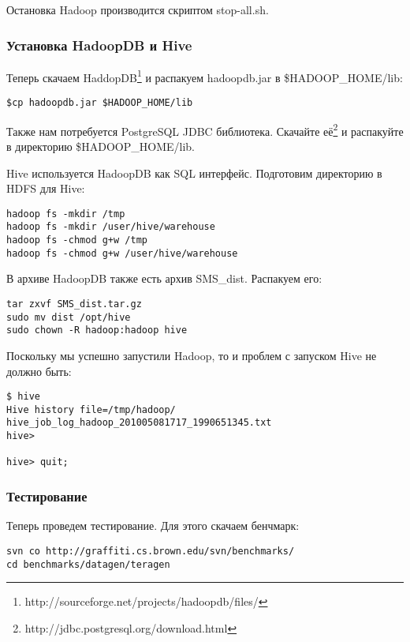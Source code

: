 Остановка Hadoop производится скриптом stop-all.sh.

\subsubsection{Установка HadoopDB и Hive}
Теперь скачаем HaddopDB\footnote{http://sourceforge.net/projects/hadoopdb/files/} и распакуем hadoopdb.jar в \$HADOOP\_HOME/lib:
\begin{lstlisting}[label=lst:haddop15,caption=Установка HadoopDB]
$cp hadoopdb.jar $HADOOP_HOME/lib
\end{lstlisting}

Также нам потребуется PostgreSQL JDBC библиотека. Скачайте её\footnote{http://jdbc.postgresql.org/download.html} и
распакуйте в директорию \$HADOOP\_HOME/lib.

Hive используется HadoopDB как SQL интерфейс. Подготовим директорию в HDFS для Hive:
\begin{lstlisting}[label=lst:haddop16,caption=Установка HadoopDB]
hadoop fs -mkdir /tmp
hadoop fs -mkdir /user/hive/warehouse
hadoop fs -chmod g+w /tmp
hadoop fs -chmod g+w /user/hive/warehouse
\end{lstlisting}

В архиве HadoopDB также есть архив SMS\_dist. Распакуем его:
\begin{lstlisting}[label=lst:haddop17,caption=Установка HadoopDB]
tar zxvf SMS_dist.tar.gz
sudo mv dist /opt/hive
sudo chown -R hadoop:hadoop hive
\end{lstlisting}

Поскольку мы успешно запустили Hadoop, то и проблем с запуском Hive не должно быть:
\begin{lstlisting}[label=lst:haddop18,caption=Установка HadoopDB]
$ hive
Hive history file=/tmp/hadoop/
hive_job_log_hadoop_201005081717_1990651345.txt
hive>

hive> quit;
\end{lstlisting}

\subsubsection{Тестирование}
Теперь проведем тестирование. Для этого скачаем бенчмарк:
\begin{lstlisting}[label=lst:haddop19,caption=Тестирование]
svn co http://graffiti.cs.brown.edu/svn/benchmarks/
cd benchmarks/datagen/teragen
\end{lstlisting}

